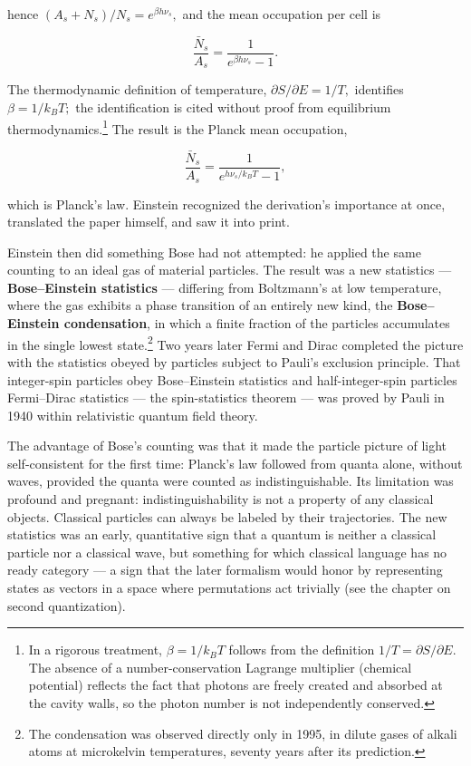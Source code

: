hence $(A_s+N_s)/N_s=e^{\beta h\nu_s},$ and the mean occupation per cell is
\begin{linenomath}
    \begin{equation}
        \frac{\bar N_s}{A_s}=\frac{1}{e^{\beta h\nu_s}-1}.
    \end{equation}
\end{linenomath}
The thermodynamic definition of temperature, $\partial S/\partial E=1/T,$ identifies $\beta=1/k_BT;$ the identification is cited without proof from equilibrium thermodynamics.\footnote{In a rigorous treatment, $\beta=1/k_BT$ follows from the definition $1/T=\partial S/\partial E.$ The absence of a number-conservation Lagrange multiplier (chemical potential) reflects the fact that photons are freely created and absorbed at the cavity walls, so the photon number is not independently conserved.} The result is the Planck mean occupation,
\begin{linenomath}
    \begin{equation}
        \frac{\bar N_s}{A_s}=\frac{1}{e^{h\nu_s/k_BT}-1},
    \end{equation}
\end{linenomath}
which is Planck's law. Einstein recognized the derivation's importance at once, translated the paper himself, and saw it into print.

Einstein then did something Bose had not attempted: he applied the same counting to an ideal gas of material particles. The result was a new statistics --- \textbf{Bose--Einstein statistics} --- differing from Boltzmann's at low temperature, where the gas exhibits a phase transition of an entirely new kind, the \textbf{Bose--Einstein condensation}, in which a finite fraction of the particles accumulates in the single lowest state.\footnote{The condensation was observed directly only in 1995, in dilute gases of alkali atoms at microkelvin temperatures, seventy years after its prediction.} Two years later Fermi and Dirac completed the picture with the statistics obeyed by particles subject to Pauli's exclusion principle. That integer-spin particles obey Bose--Einstein statistics and half-integer-spin particles Fermi--Dirac statistics --- the spin-statistics theorem --- was proved by Pauli in 1940 within relativistic quantum field theory.

The advantage of Bose's counting was that it made the particle picture of light self-consistent for the first time: Planck's law followed from quanta alone, without waves, provided the quanta were counted as indistinguishable. Its limitation was profound and pregnant: indistinguishability is not a property of any classical objects. Classical particles can always be labeled by their trajectories. The new statistics was an early, quantitative sign that a quantum is neither a classical particle nor a classical wave, but something for which classical language has no ready category --- a sign that the later formalism would honor by representing states as vectors in a space where permutations act trivially (see the chapter on second quantization).

